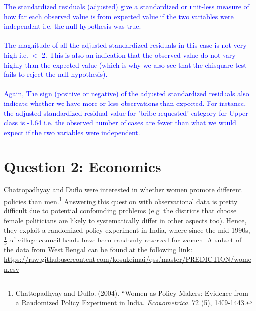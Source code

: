 \documentclass[12pt,letterpaper]{article}
\begin{document}
\begin{enumerate}
\textcolor{blue}{
The standardized residuals (adjusted) give a standardized or unit-less measure of how far each observed value is from expected value if the two variables were independent i.e. the null hypothesis was true.\\
\\The magnitude of all the adjusted standardized residuals in this case is not very high i.e. $<$ 2. This is also an indication that the observed value do not vary highly than the expected value (which is why we also see that the chisquare test fails to reject the null hypothesis).\\
\\Again, The sign (positive or negative) of the adjusted standardized residuals also indicate whether we have more or less observations than expected. For instance, the adjusted standardized residual value for 'bribe requested' category for Upper class is -1.64 i.e. the observed number of cases are fewer than what we would expect if the two variables were independent.  
}
	
\end{enumerate}
\vspace{1cm}

\section*{Question 2: Economics}
Chattopadhyay and Duflo were interested in whether women promote different policies than men.\footnote{Chattopadhyay and Duflo. (2004). ``Women as Policy Makers: Evidence from a Randomized Policy Experiment in India. \textit{Econometrica}. 72 (5), 1409-1443.} Answering this question with observational data is pretty difficult due to potential confounding problems (e.g. the districts that choose female politicians are likely to systematically differ in other aspects too). Hence, they exploit a randomized policy experiment in India, where since the mid-1990s, $\frac{1}{3}$ of village council heads have been randomly reserved for women. A subset of the data from West Bengal can be found at the following link: \url{https://raw.githubusercontent.com/kosukeimai/qss/master/PREDICTION/women.csv}\\
\end{document}
